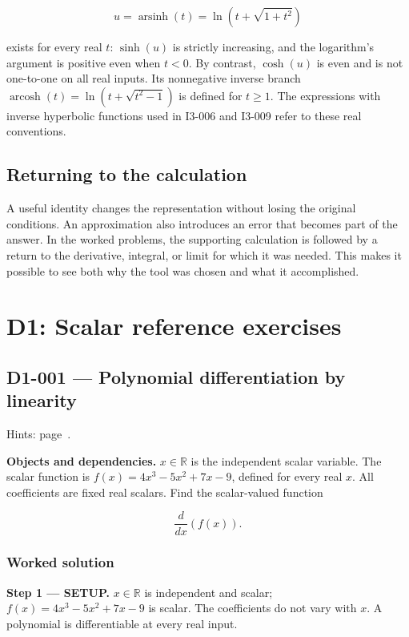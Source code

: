 \documentclass[11pt,oneside,openany]{book}
\begin{document}
\[
u=\operatorname{arsinh}(t)=\ln\left(t+\sqrt{1+t^2}\right)
\]

exists for every real \(t\): \(\sinh(u)\) is strictly increasing, and the logarithm's
argument is positive even when \(t<0\). By contrast, \(\cosh(u)\) is even and is
not one-to-one on all real inputs. Its nonnegative inverse branch
\(\operatorname{arcosh}(t)=\ln(t+\sqrt{t^2-1})\) is defined for \(t\ge1\).
The expressions with inverse hyperbolic functions used in I3-006 and I3-009
refer to these real conventions.

\section{Returning to the calculation}

A useful identity changes the representation without losing the original
conditions. An approximation also introduces an error that becomes part of the
answer. In the worked problems, the supporting calculation is followed by a
return to the derivative, integral, or limit for which it was needed. This makes
it possible to see both why the tool was chosen and what it accomplished.
\endgroup

\chapter{D1: Scalar reference exercises}
\markright{}
\section{D1-001 --- Polynomial differentiation by linearity}
\label{problem:D1-001}
{\small Hints: page~\pageref{hints:D1-001}.}\par\medskip

\textbf{Objects and dependencies.} \(x\in\mathbb R\) is the independent scalar variable.
The scalar function is \(f(x)=4x^3-5x^2+7x-9\), defined for every real \(x\).
All coefficients are fixed real scalars. Find the scalar-valued function

\[
\frac{d}{dx}\left(f(x)\right).
\]
\subsection*{Worked solution}

\textbf{Step 1 --- SETUP.} \(x\in\mathbb R\) is independent and scalar; \(f(x)=4x^3-5x^2+7x-9\)
is scalar. The coefficients do not vary with \(x\). A polynomial is differentiable
at every real input.
\end{document}
